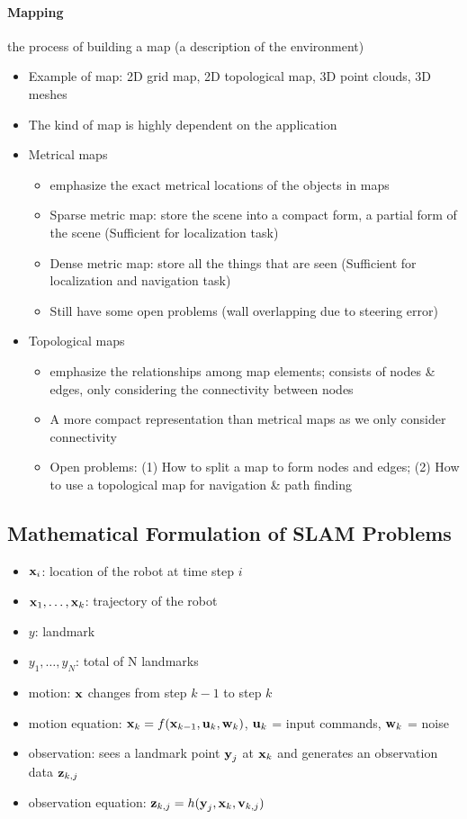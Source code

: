\documentclass[main.tex]{subfiles}
\begin{document}
\paragraph{Mapping} the process of building a map (a description of the environment)
\begin{itemize}
\item Example of map: 2D grid map, 2D topological map, 3D point clouds, 3D meshes
\item The kind of map is highly dependent on the application
\item Metrical maps
\begin{itemize}
	\item emphasize the exact metrical locations of the objects in maps
	\item Sparse metric map: store the scene into a compact form, a partial form of the scene (Sufficient for localization task)
	\item Dense metric map: store all the things that are seen (Sufficient for localization and navigation task)
	\item Still have some open problems (wall overlapping due to steering error)
\end{itemize}
\item Topological maps
\begin{itemize}
	\item emphasize the relationships among map elements; consists of nodes \& edges, only considering the connectivity between nodes
	\item A more compact representation than metrical maps as we only consider connectivity
	\item Open problems: (1) How to split a map to form nodes and edges; (2) How to use a topological map for navigation \& path finding
\end{itemize}
\end{itemize}

\subsection{Mathematical Formulation of SLAM Problems}

\begin{itemize}
\item $\operatorname*{\mathbf{x}}_i$: location of the robot at time step $i$
\item $\operatorname*{\mathbf{x}}_1,\dots,\operatorname*{\mathbf{x}}_k$: trajectory of the robot
\item $y$: landmark
\item $y_1,\dots,y_N$: total of N landmarks
\item motion: $\operatorname*{\mathbf{x}}$ changes from step $k-1$ to step $k$
\item motion equation: $\operatorname*{\mathbf{x}}_k = f(\operatorname*{\mathbf{x}}_{k-1}, \operatorname*{\mathbf{u}}_k, \operatorname*{\mathbf{w}}_k)$, $\operatorname*{\mathbf{u}}_k$ = input commands, $\operatorname*{\mathbf{w}}_k$ = noise
\item observation: sees a landmark point $\operatorname*{\mathbf{y}}_j$ at $\operatorname*{\mathbf{x}}_k$ and generates an observation data $\operatorname*{\mathbf{z}}_{k,j}$
\item observation equation: $\operatorname*{\mathbf{z}}_{k,j} = h(\operatorname*{\mathbf{y}}_j,\operatorname*{\mathbf{x}}_k,\operatorname*{\mathbf{v}}_{k,j})$
\end{itemize}
\end{document}
